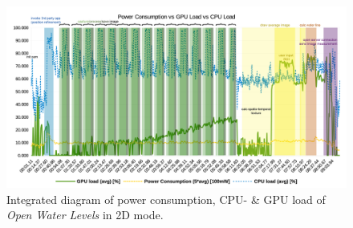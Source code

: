 \documentclass[review]{elsarticle}
\begin{document}
\begin{figure}[htbp!]
\centering
\includegraphics[keepaspectratio, width=0.95\columnwidth]{graphics/OWL_Nexus5/Power_GPU_CPU_run2}
\caption{Integrated diagram of power consumption, CPU- \& GPU load of \textit{Open Water Levels} in 2D mode.}
\label{fig:power:Power_CPU_GPU_OWL:2D}
\end{figure}
\end{document}
